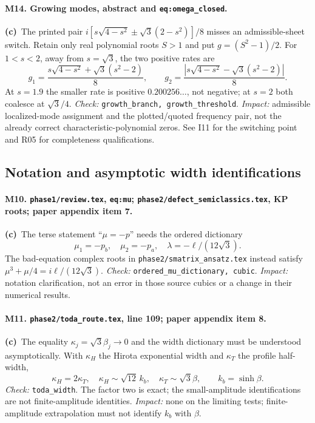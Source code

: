 \documentclass[11pt,a4paper]{article}
\newcommand{\C}{\textbf{(c)}\ }
\newcommand{\file}[1]{\nolinkurl{#1}}
\newcommand{\test}[1]{\textit{Check:} \file{#1}.}
\begin{document}
\paragraph{M14. Growing modes, abstract and \file{eq:omega_closed}.}
\C The printed pair $i[s\sqrt{4-s^2}\pm\sqrt3(2-s^2)]/8$ misses an
admissible-sheet switch. Retain only real polynomial roots $S>1$ and put
$g=(S^2-1)/2$. For $1<s<2$, away from $s=\sqrt3$, the two positive rates are
\[
 g_1=\frac{s\sqrt{4-s^2}+\sqrt3(s^2-2)}8,\qquad
 g_2=\frac{|s\sqrt{4-s^2}-\sqrt3(s^2-2)|}8.
\]
At $s=1.9$ the smaller rate is positive $0.200256\ldots$, not negative;
at $s=2$ both coalesce at $\sqrt3/4$.
\test{growth_branch, growth_threshold}
\textit{Impact:} admissible localized-mode assignment and the plotted/quoted
frequency pair, not the already correct characteristic-polynomial zeros.
See I11 for the switching point and R05 for completeness qualifications.

\subsection{Notation and asymptotic width identifications}
\paragraph{M10. \file{phase1/review.tex}, \file{eq:mu}; \file{phase2/defect_semiclassics.tex}, KP roots; paper appendix item 7.}
\C The terse statement ``$\mu=-p$'' needs the ordered dictionary
\[
 \mu_1=-p_b,\quad \mu_2=-p_a,\quad
 \lambda=-\ell/(12\sqrt3).
\]
The bad-equation complex roots in \file{phase2/smatrix_ansatz.tex}
instead satisfy $\mu^3+\mu/4=i\ell/(12\sqrt3)$.
\test{ordered_mu_dictionary, cubic}
\textit{Impact:} notation clarification, not an error in those source
cubics or a change in their numerical results.

\paragraph{M11. \file{phase2/toda_route.tex}, line 109; paper appendix item 8.}
\C The equality $\kappa_j=\sqrt3\beta_j\to0$ and the width dictionary
must be understood asymptotically. With $\kappa_H$ the Hirota exponential
width and $\kappa_T$ the profile half-width,
\[
 \kappa_H=2\kappa_T,\quad \kappa_H\sim\sqrt{12}\,k_b,\quad
 \kappa_T\sim\sqrt3\beta,\qquad k_b=\sinh\beta.
\]
\test{toda_width} The factor two is exact; the small-amplitude
identifications are not finite-amplitude identities.
\textit{Impact:} none on the limiting tests; finite-amplitude extrapolation
must not identify $k_b$ with $\beta$.
\end{document}
